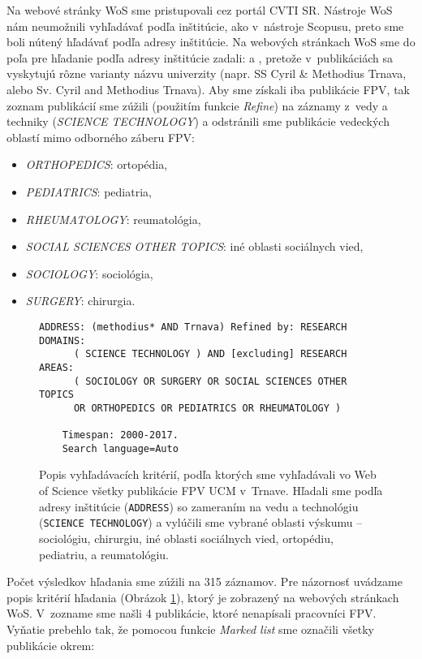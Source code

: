Na webové stránky WoS sme pristupovali cez portál CVTI SR. Nástroje WoS nám
neumožnili vyhľadávať podľa inštitúcie, ako v~nástroje Scopusu, preto sme boli
nútený hľadávať podľa adresy inštitúcie. Na webových stránkach WoS sme do poľa
pre hľadanie podľa adresy inštitúcie zadali:  a ,
pretože v~publikáciách sa vyskytujú rôzne varianty názvu univerzity (napr. SS
Cyril \& Methodius Trnava, alebo Sv. Cyril and Methodius Trnava).  Aby sme
získali iba publikácie FPV, tak zoznam publikácií sme zúžili (použitím funkcie
\emph{Refine}) na záznamy z~vedy a techniky (\emph{SCIENCE TECHNOLOGY}) a
odstránili sme publikácie vedeckých oblastí mimo odborného záberu FPV:

\begin{itemize}
\item \emph{ORTHOPEDICS}: ortopédia,
\item \emph{PEDIATRICS}: pediatria,
\item \emph{RHEUMATOLOGY}: reumatológia,
\item \emph{SOCIAL SCIENCES OTHER TOPICS}: iné oblasti sociálnych vied,
\item \emph{SOCIOLOGY}: sociológia,
\item \emph{SURGERY}: chirurgia.
\end{itemize}

\begin{figure}
  \footnotesize
  \begin{Verbatim}[frame=single]
    ADDRESS: (methodius* AND Trnava) Refined by: RESEARCH DOMAINS:
      ( SCIENCE TECHNOLOGY ) AND [excluding] RESEARCH AREAS:
      ( SOCIOLOGY OR SURGERY OR SOCIAL SCIENCES OTHER TOPICS
      OR ORTHOPEDICS OR PEDIATRICS OR RHEUMATOLOGY )

    Timespan: 2000-2017.
    Search language=Auto
  \end{Verbatim}
  \vspace*{-4mm}
  \caption[Popis kritérií vyhľadávania vo WoS pre FPV]%
  {Popis vyhľadávacích kritérií, podľa ktorých sme vyhľadávali vo Web of Science
    všetky publikácie FPV UCM v~Trnave.  Hľadali sme podľa adresy inštitúcie
    (\texttt{ADDRESS}) so zameraním na vedu a technológiu (\texttt{SCIENCE
      TECHNOLOGY}) a vylúčili sme vybrané oblasti výskumu -- sociológiu,
    chirurgiu, iné oblasti sociálnych vied, ortopédiu, pediatriu, a
    reumatológiu.}
  \label{fig:wos.query}
\end{figure}


Počet výsledkov hľadania sme zúžili na 315 záznamov. Pre názornosť uvádzame
popis kritérií hľadania (Obrázok \ref{fig:wos.query}), ktorý je zobrazený na
webových stránkach WoS.  V~zozname sme našli 4 publikácie, ktoré nenapísali
pracovníci FPV.  Vyňatie prebehlo tak, že pomocou funkcie \emph{Marked list} sme
označili všetky publikácie okrem:

